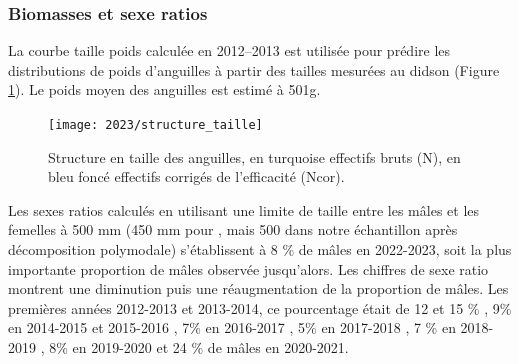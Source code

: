 \documentclass[11pt,twocolumn,titlepage,twoside]{article}
\newlength\defaultparindent
\begin{document}
\subsubsection{Biomasses et sexe ratios}
\label{parpoids}

 La courbe taille poids calculée en 2012--2013 est utilisée pour prédire les
 distributions de poids d'anguilles à partir des tailles mesurées au didson (Figure \ref{structure_taille}). Le poids moyen
des anguilles est estimé à \num{501}g.
\begin{figure}[htbp]
  \centering
  \texttt{[image: 2023/structure\_taille]}
  \caption[Structure en taille]{Structure en taille des anguilles, en turquoise
   effectifs bruts (N), en bleu foncé effectifs corrigés de l'efficacité (Ncor).}
  \label{structure_taille}
\end{figure}
Les sexes ratios calculés en utilisant une limite de 
 taille entre les mâles et les femelles à 500 mm (450 mm pour
 \citep{acou_estimation_2010}, mais 500 dans notre échantillon après
 décomposition polymodale) s'établissent à
 \num{8} \% de mâles en 2022-2023, soit la plus importante proportion de mâles observée jusqu'alors.
 Les chiffres de sexe ratio montrent une diminution puis une réaugmentation de
 la proportion de mâles. Les premières années 2012-2013 et 2013-2014, ce
 pourcentage était de 12 et 15 \%  \citep{briand_suivi_2014, briand_suivi_2015}, 9\%
en 2014-2015 et 2015-2016 \citep{briand_suivi_2016,
briand_suivi_2017}, 7\% en 2016-2017 \citep{briand_suivi_2018}, 5\% en
2017-2018 \citep{briand_suivi_2018}, 7 \% en 2018-2019
\citep{briand_suivi_2019}, 8\% en 2019-2020 \citep{briand_suivi_2020} et 24 \%
de mâles en 2020-2021.

\vspace{\dimexpr.8pt+\fboxsep\relax}
\noindent       
{}
\vspace{\dimexpr.8pt+\fboxsep\relax}
\end{document}
